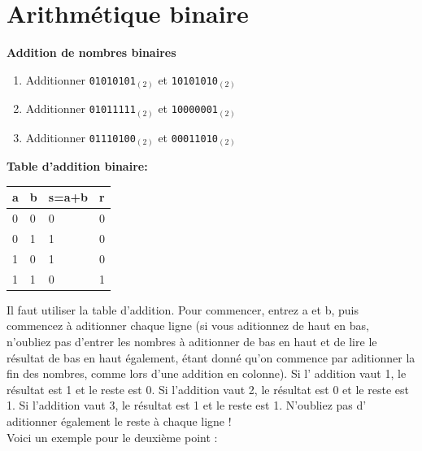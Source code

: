 \section{Arithmétique binaire}

\begin{Exercice}[15 minutes] \textbf{Addition de nombres binaires}
    \begin{enumerate}
        \item Additionner \lstinline{01010101}$_{(2)}$ et \lstinline{10101010}$_{(2)}$
        \item Additionner \lstinline{01011111}$_{(2)}$ et \lstinline{10000001}$_{(2)}$
        \item Additionner \lstinline{01110100}$_{(2)}$ et \lstinline{00011010}$_{(2)}$
    \end{enumerate}
    \begin{conseil}
\textbf{Table d'addition binaire:}\\
        \begin{tabular}{| C{0.1\textwidth} | C{0.1\textwidth} | C{0.1\textwidth} | C{0.1\textwidth} |} 
            \hline
            \textbf{a} & \textbf{b} & \textbf{s=a+b} & \textbf{r}\\ [0.5ex]
             & 0 & 0 & 0 \\ [0.5ex] 
             & 1 & 1 & 0 \\ [0.5ex] 
             & 0 & 1 & 0 \\ [0.5ex] 
             & 1 & 0 & 1 \\ [0.5ex] 
            \hline
        \end{tabular}
    \end{conseil}
    
    \begin{solution}
        Il faut utiliser la table d'addition. Pour commencer, entrez a et b, puis commencez à aditionner chaque ligne (si vous aditionnez de haut en bas, n'oubliez pas d'entrer les nombres à aditionner de bas en haut et de lire le résultat de bas en haut également, étant donné qu'on commence par aditionner la fin des nombres, comme lors d'une addition en colonne). Si l' addition vaut 1, le résultat est 1 et le reste est 0. Si l'addition vaut 2, le résultat est 0 et le reste est 1. Si l'addition vaut 3, le résultat est 1 et le reste est 1. N'oubliez pas d' aditionner également le reste à chaque ligne ! \\
        
Voici un exemple pour le deuxième point : \\


\end{solution}
\end{Exercice}
